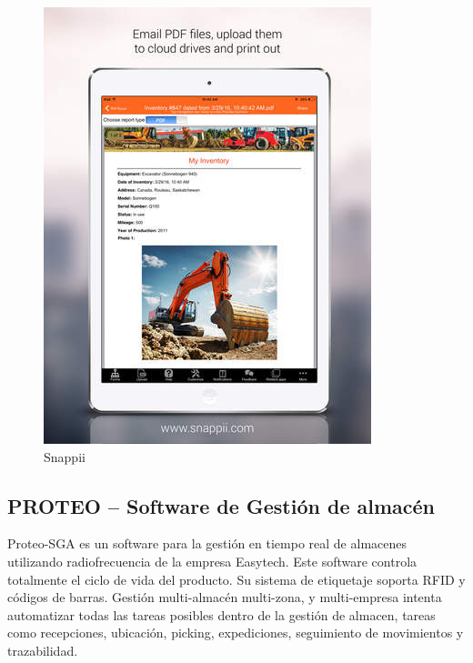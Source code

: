 \documentclass[a4paper,11pt]{book}
\begin{document}
\begin{figure}[H]  
\centering 
\includegraphics[scale=0.5]{imagenes/estudioArte/shapi.jpeg}
\caption{Snappii}  
\end{figure}


\subsection{PROTEO – Software de Gestión de almacén}
Proteo-SGA\cite{pro} es un software para la gestión en tiempo real de almacenes utilizando radiofrecuencia de la empresa Easytech\cite{easy}. Este software controla totalmente el ciclo de vida del producto. Su sistema de etiquetaje soporta RFID y códigos de barras. Gestión multi-almacén multi-zona, y multi-empresa intenta automatizar todas las tareas posibles dentro de la gestión de almacen, tareas como recepciones, ubicación, picking, expediciones, seguimiento de movimientos y trazabilidad. 
\end{document}
